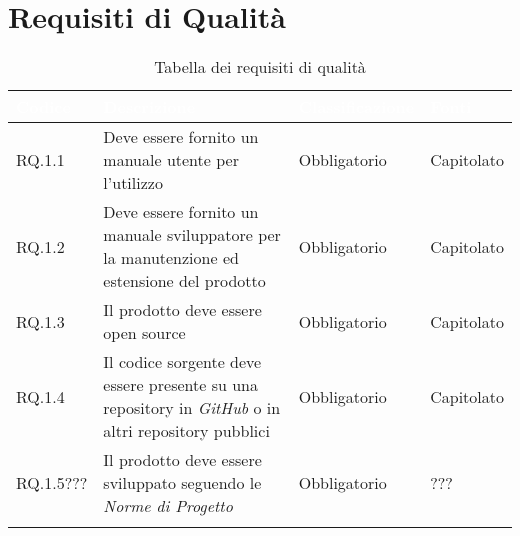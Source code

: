 \section{Requisiti di Qualità}
\begin{center}
  \centering
  \begin{longtable}{|L{1,5cm}|C{5,5cm}|C{3cm}|C{2cm}|}
    \hline
    \textcolor[HTML]{FFFFFF}{\textbf{Codice}} & \textcolor[HTML]{FFFFFF}{\textbf{Descrizione}} & \textcolor[HTML]{FFFFFF}{\textbf{Classificazione}} & \textcolor[HTML]{FFFFFF}{\textbf{Fonti}}
    \\ \hline
    RQ.1.1 & Deve essere fornito un manuale utente per l'utilizzo & Obbligatorio & Capitolato \\ \hline
    RQ.1.2 & Deve essere fornito un manuale sviluppatore per la manutenzione ed estensione del prodotto & Obbligatorio & Capitolato \\ \hline
    RQ.1.3 & Il prodotto deve essere open source & Obbligatorio & Capitolato \\ \hline
    RQ.1.4 & Il codice sorgente deve essere presente su una repository in \textit{GitHub} o in altri repository pubblici & Obbligatorio & Capitolato \\ \hline
    RQ.1.5??? & Il prodotto deve essere sviluppato seguendo le \textit{Norme di Progetto} & Obbligatorio & ??? \\ \hline

    \caption{Tabella dei requisiti di qualità}
  \end{longtable}
\end{center}

